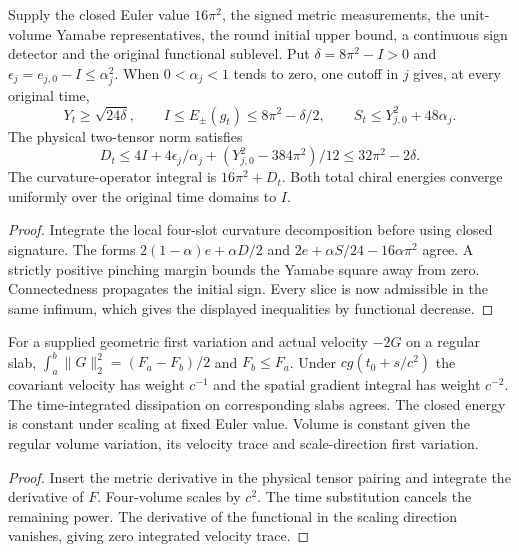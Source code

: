 \begin{proposition}
\label{prop:ed47-budget}
\leanok
Supply the closed Euler value $16\pi^2$, the signed metric measurements,
the unit-volume Yamabe representatives, the round initial upper bound,
a continuous sign detector and the original functional sublevel.
Put $\delta=8\pi^2-I>0$ and $\epsilon_j=e_{j,0}-I\le\alpha_j^2$.
When $0<\alpha_j<1$ tends to zero, one cutoff in $j$ gives, at every
original time,
\[
 Y_t\ge\sqrt{24\delta},\qquad I\le E_\pm(g_t)\le8\pi^2-\delta/2,
 \qquad S_t\le Y_{j,0}^2+48\alpha_j .
\]
The physical two-tensor norm satisfies
\[
 D_t\le4I+4\epsilon_j/\alpha_j+(Y_{j,0}^2-384\pi^2)/12
 \le32\pi^2-2\delta.
\]
The curvature-operator integral is $16\pi^2+D_t$.
Both total chiral energies converge uniformly over the original time domains to $I$.
\end{proposition}
\begin{proof}
\leanok
Integrate the local four-slot curvature decomposition before using closed
signature. The forms $2(1-\alpha)e+\alpha D/2$ and
$2e+\alpha S/24-16\alpha\pi^2$ agree. A strictly positive pinching
margin bounds the Yamabe square away from zero. Connectedness propagates
the initial sign. Every slice is now admissible in the same infimum, which
gives the displayed inequalities by functional decrease.
\end{proof}

\begin{proposition}
\label{prop:ed47-motion}
\leanok
For a supplied geometric first variation and actual velocity $-2G$ on
a regular slab, $\int_a^b\|G\|_2^2=(F_a-F_b)/2$ and $F_b\le F_a$.
Under $c g(t_0+s/c^2)$ the covariant velocity has weight $c^{-1}$ and
the spatial gradient integral has weight $c^{-2}$. The time-integrated
dissipation on corresponding slabs agrees. The closed energy is
constant under scaling at fixed Euler value. Volume is constant given
the regular volume variation, its velocity trace and scale-direction
first variation.
\end{proposition}
\begin{proof}
\leanok
Insert the metric derivative in the physical tensor pairing and integrate
the derivative of $F$. Four-volume scales by $c^2$. The time substitution
cancels the remaining power. The derivative of the functional in the
scaling direction vanishes, giving zero integrated velocity trace.
\end{proof}

